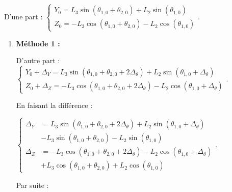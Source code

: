\begin{corrige}

D'une part : 
$
\left\{
\begin{array}{l}
Y_0 =  L_3 \sin  \left(\theta_{1,0}+ \theta_{2,0} \right)  + L_2 \sin \left(\theta_{1,0}  \right) \\
Z_0 =- L_3 \cos \left(\theta_{1,0} + \theta_{2,0} \right) - L_2 \cos \left(\theta_{1,0} \right)  
\end{array}.
\right.
$


\begin{enumerate}
\item \textbf{Méthode 1 : }

D'autre part : 
$
\left\{
\begin{array}{l}
Y_0 +\Delta_{Y}=  L_3 \sin  \left(\theta_{1,0}+ \theta_{2,0} + 2\Delta_{\theta} \right)  + L_2 \sin \left(\theta_{1,0} + \Delta_{\theta} \right) \\
Z_0 +\Delta_{Z}=- L_3 \cos \left(\theta_{1,0} + \theta_{2,0}+ 2\Delta_{\theta} \right) - L_2 \cos \left(\theta_{1,0}+\Delta_{\theta} \right)  
\end{array}.
\right.
$

En faisant la différence :

$
\left\{
\begin{array}{ll}
\Delta_{Y}& =  L_3 \sin  \left(\theta_{1,0}+ \theta_{2,0} + 2\Delta_{\theta} \right)  + L_2 \sin \left(\theta_{1,0} + \Delta_{\theta} \right)  \\ 
& - L_3 \sin  \left(\theta_{1,0}+ \theta_{2,0} \right)  - L_2 \sin \left(\theta_{1,0}  \right)\\
\Delta_{Z} & =- L_3 \cos \left(\theta_{1,0} + \theta_{2,0}+ 2\Delta_{\theta} \right) - L_2 \cos \left(\theta_{1,0}+\Delta_{\theta} \right)   
\\& +  L_3 \cos \left(\theta_{1,0} + \theta_{2,0} \right) + L_2 \cos \left(\theta_{1,0} \right)
\end{array}.
\right.
$

Par suite : 


\end{enumerate}
\end{corrige}
